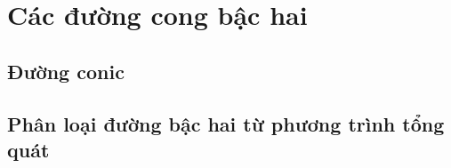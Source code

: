 \chapter{Các đường cong bậc hai}
\section{Đường conic}
\section{Phân loại đường bậc hai từ phương trình tổng quát}
